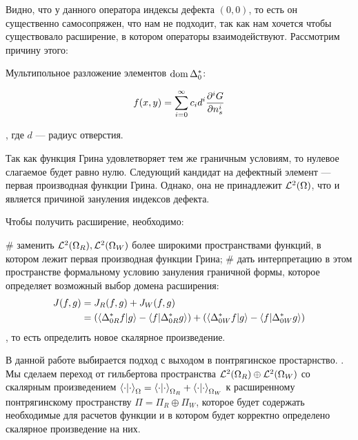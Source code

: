 
Видно, что у данного оператора индексы дефекта $(0, 0)$, то есть он существенно самосопряжен, что нам не подходит, так как нам хочется чтобы существовало расширение, в котором операторы взаимодействуют. Рассмотрим причину этого:


Мультипольное разложение элементов $\operatorname{dom} \Delta_0^*$:

\[
f(x, y) = \sum\limits_{i = 0}^\infty c_i d^i \pdv[i]{G}{n_s} (x, y, x_0, y_0; E_0)
\]

, где $d$ — радиус отверстия.

Так как функция Грина удовлетворяет тем же граничным условиям, то нулевое слагаемое будет равно нулю. Следующий кандидат на дефектный элемент — первая производная функции Грина. Однако, она не принадлежит $\mathcal{L}^2(\Omega)$, что и является причиной зануления индексов дефекта.

Чтобы получить расширение, необходимо:
\begin{ilist}
# заменить $\mathcal{L}^2(\Omega_R), \mathcal{L}^2(\Omega_W)$ более широкими пространствами функций, в котором лежит первая производная функции Грина;
# дать интерпретацию в этом пространстве формальному условию зануления граничной формы, которое определяет возможный выбор домена расширения:
\begin{align*}
J(f, g)
& = J_R(f, g) + J_W(f, g) \\
& = (\ip{\Delta_{0R}^* f}{g} - \ip{f}{\Delta_{0R}^* g}) + (\ip{\Delta_{0W}^* f}{g} - \ip{f}{\Delta_{0W}^* g})
\end{align*}
, то есть определить новое скалярное произведение.
\end{ilist}
В данной работе выбирается подход с выходом в понтрягинское простарнство. . Мы сделаем переход от гильбертова пространства $\mathcal{L}^2(\Omega_R) \oplus \mathcal{L}^2(\Omega_W)$ со скалярным произведением $\ipcdot_\Omega = \ipcdot_{\Omega_R} + \ipcdot_{\Omega_W}$ к расширенному понтрягинскому пространству $\Pi = \Pi_R \oplus \Pi_W$, которое будет содержать необходимые для расчетов функции и в котором будет корректно определено скалярное произведение на них.




